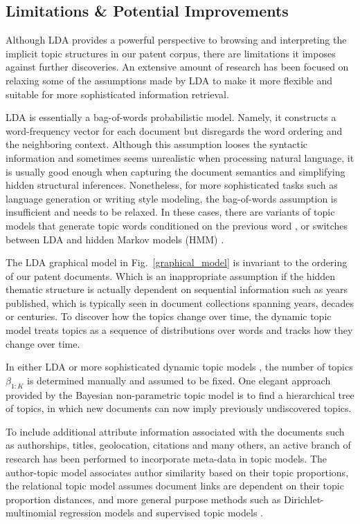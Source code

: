 \documentclass[conference]{IEEEtran}
\begin{document}
\subsection{Limitations \& Potential Improvements}
Although LDA provides a powerful perspective to browsing and interpreting the implicit topic structures in our patent corpus, there are limitations it imposes against further discoveries. An extensive amount of research has been focused on relaxing some of the assumptions made by LDA to make it more flexible and suitable for more sophisticated information retrieval. 

LDA is essentially a bag-of-words probabilistic model. Namely, it constructs a word-frequency vector for each document but disregards the word ordering and the neighboring context. Although this assumption looses the syntactic information and sometimes seems unrealistic when processing natural language, it is usually good enough when capturing the document semantics and simplifying hidden structural inferences. Nonetheless, for more sophisticated tasks such as language generation or writing style modeling, the bag-of-words assumption is insufficient and needs to be relaxed. In these cases, there are variants of topic models that generate topic words conditioned on the previous word \cite{wallach2006}, or switches between LDA and hidden Markov models (HMM) \cite{griffiths2005}.

The LDA graphical model in Fig.~\ref{graphical_model} is invariant to the ordering of our patent documents. Which is an inappropriate assumption if the hidden thematic structure is actually dependent on sequential information such as years published, which is typically seen in document collections spanning years, decades or centuries. To discover how the topics change over time, the dynamic topic model \cite{blei2006} treats topics as a sequence of distributions over words and tracks how they change over time.

In either LDA or more sophisticated dynamic topic models \cite{blei2006}, the number of topics $\beta_{1:K}$ is determined manually and assumed to be fixed. One elegant approach provided by the Bayesian non-parametric topic model \cite{teh2006} is to find a hierarchical tree of topics, in which new documents can now imply previously undiscovered topics.

To include additional attribute information associated with the documents such as authorships, titles, geolocation, citations and many others, an active branch of research has been performed to incorporate meta-data in topic models. The author-topic model \cite{rosen-zvi2004} associates author similarity based on their topic proportions, the relational topic model \cite{blei2010} assumes document links are dependent on their topic proportion distances, and more general purpose methods such as Dirichlet-multinomial regression models \cite{mimno2008} and supervised topic models \cite{blei2007}.
\end{document}
